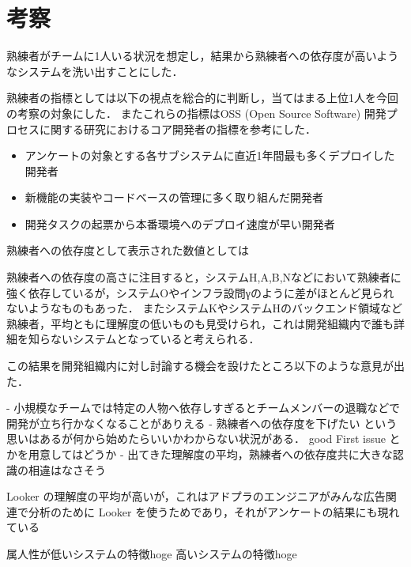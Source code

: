 \section{考察}
熟練者がチームに1人いる状況を想定し，結果から熟練者への依存度が高いようなシステムを洗い出すことにした．

熟練者の指標としては以下の視点を総合的に判断し，当てはまる上位1人を今回の考察の対象にした．
またこれらの指標はOSS (Open Source Software) 開発プロセスに関する研究\cite{bib:mockus}におけるコア開発者の指標を参考にした．

\begin{itemize}
	\item アンケートの対象とする各サブシステムに直近1年間最も多くデプロイした開発者
	\item 新機能の実装やコードベースの管理に多く取り組んだ開発者
	\item 開発タスクの起票から本番環境へのデプロイ速度が早い開発者
\end{itemize}

熟練者への依存度として表示された数値としては

熟練者への依存度の高さに注目すると，システムH,A,B,Nなどにおいて熟練者に強く依存しているが，システムOやインフラ設問γのように差がほとんど見られないようなものもあった．
またシステムKやシステムHのバックエンド領域など熟練者，平均ともに理解度の低いものも見受けられ，これは開発組織内で誰も詳細を知らないシステムとなっていると考えられる．

この結果を開発組織内に対し討論する機会を設けたところ以下のような意見が出た．

- 小規模なチームでは特定の人物へ依存しすぎるとチームメンバーの退職などで開発が立ち行かなくなることがありえる
- 熟練者への依存度を下げたい という思いはあるが何から始めたらいいかわからない状況がある． good First issue とかを用意してはどうか
- 出てきた理解度の平均，熟練者への依存度共に大きな認識の相違はなさそう

Looker の理解度の平均が高いが，これはアドプラのエンジニアがみんな広告関連で分析のために Looker を使うためであり，それがアンケートの結果にも現れている



属人性が低いシステムの特徴hoge
高いシステムの特徴hoge




